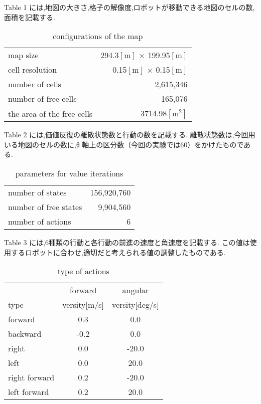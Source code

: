 \documentclass{jarticle}
\begin{document}

Table 1 には,地図の大きさ,格子の解像度,ロボットが移動できる地図のセルの数,面積を記載する.

\begin{table}[hbtp]
  \caption{conﬁgurations of the map}
  \centering
  \begin{tabular}{l|r}
    \hline
    map size & 294.3$\mathrm{[m]}$ × 199.95$\mathrm{[m]}$\\
    cell resolution &  0.15$\mathrm{[m]}$ × 0.15$\mathrm{[m]}$ \\
		number of cells & 2,615,346\\
    number of free cells & 165,076\\
		the area of the free cells & 3714.98$\mathrm{[m^2]}$\\
    \hline
  \end{tabular}
\end{table}

Table 2 には,価値反復の離散状態数と行動の数を記載する.
離散状態数は,今回用いる地図のセルの数に,θ 軸上の区分数（今回の実験では60）をかけたものである.

\begin{table}[hbtp]
  \caption{parameters for value iterations}
  \centering
  \begin{tabular}{l|r}
    \hline
    number of states & 156,920,760\\
    number of free states &  9,904,560\\
		number of actions & 6\\
    \hline
  \end{tabular}
\end{table}

Table 3 には,6種類の行動と各行動の前進の速度と角速度を記載する.
この値は使用するロボットに合わせ,適切だと考えられる値の調整したものである.

\begin{table}[hbtp]
	\caption{type of actions}
	\centering
	 \begin{tabular}{l|cc}
		\hline
		 & forward & angular \\
		type & versity[m/s] & versity[deg/s] \\
		\hline \hline
		forward & 0.3 & 0.0 \\
		backward & -0.2 & 0.0 \\
		right & 0.0 & -20.0 \\
		left & 0.0 & 20.0 \\
		right forward & 0.2 & -20.0 \\
		left forward & 0.2 & 20.0 \\
		\hline
	 \end{tabular}
 \end{table}
\end{document}
